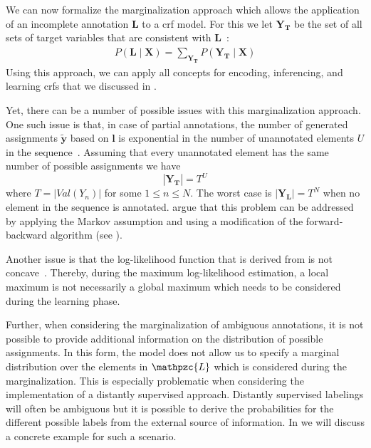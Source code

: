 \bigskip

We can now formalize the marginalization approach which allows the application of an incomplete annotation $\bm{L}$ to a \gls{crf} model.
For this we let $\mathbf{Y}_{\bm{T}}$ be the set of all sets of \glspl{target variable} that are consistent with $\bm{L}$~\citep{tsuboi2008training}:
\begin{equation}
  \label{equ:crf-marginalization}
  \begin{split}
    P\left(\bm{L}\mid\mathbf{X}\right)=\sum_{\mathbf{Y}_{\bm{T}}}P\left(\mathbf{Y}_{\bm{T}}\mid\mathbf{X}\right)
  \end{split}
\end{equation}
Using this approach, we can apply all concepts for encoding, inferencing, and learning \glspl{crf} that we discussed in .

\bigskip

Yet, there can be a number of possible issues with this marginalization approach.
One such issue is that, in case of partial annotations, the number of generated assignments $\mathbf{\tilde{y}}$ based on ${\bm{l}}$ is exponential in the number of unannotated elements $U$ in the sequence~\citep{tsuboi2008training}.
Assuming that every unannotated element has the same number of possible assignments we have
\begin{equation}
  \label{equ:marginalization-number-of-assingments}
  |\mathbf{Y}_{\bm{T}}|=T^U
\end{equation}
where $T=|Val\left(Y_n\right)|$ for some $1\leq n\leq N$.
The worst case is $|\mathbf{Y}_{\bm{L}}|=T^N$ when no element in the sequence is annotated.
\citep{tsuboi2008training} argue that this problem can be addressed by applying the Markov assumption and using a modification of the forward-backward algorithm (see ).


Another issue is that the log-likelihood function that is derived from  is not concave~\citep{tsuboi2008training}.
Thereby, during the maximum log-likelihood estimation, a local maximum is not necessarily a global maximum which needs to be considered during the learning phase.

Further, when considering the marginalization of ambiguous annotations, it is not possible to provide additional information on the distribution of possible assignments.
In this form, the model does not allow us to specify a \gls{marginal distribution} over the elements in $\mathpzc{L}$ which is considered during the marginalization.
This is especially problematic when considering the implementation of a distantly supervised approach.
Distantly supervised labelings will often be ambiguous but it is possible to derive the probabilities for the different possible labels from the external source of information.
In  we will discuss a concrete example for such a scenario.

